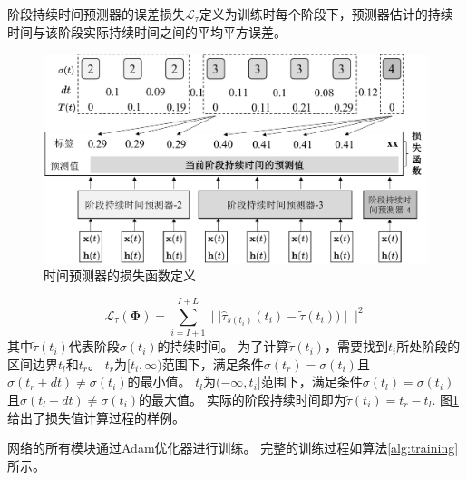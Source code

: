 阶段持续时间预测器的误差损失$\mathcal{L}_{\tau}$定义为训练时每个阶段下，预测器估计的持续时间与该阶段实际持续时间之间的平均平方误差。

\begin{figure}
    \centering
    \includegraphics[width=0.8\linewidth]{figures/chapter4/dt_label.pdf}
    \caption{时间预测器的损失函数定义}
    \label{fig:dt_label}
\end{figure}
\begin{equation}
    \mathcal{L}_{\tau}(\boldsymbol \Phi) =\sum_{i=I+1}^{I+L} \mid\mid\hat{\tau}_{s(t_i) }(t_i)-\tilde {\tau}(t_i))\mid\mid^2
\end{equation}
其中$\tilde {\tau}(t_i)$代表阶段$\sigma(t_i)$的持续时间。
为了计算$\tilde {\tau}(t_i)$，需要找到$t_i$所处阶段的区间边界$t_l$和$t_r$。
$t_r$为$[t_i, \infty)$范围下，满足条件$\sigma(t_r)=\sigma(t_i)$且$\sigma(t_r+dt)\neq \sigma(t_i)$的最小值。
$t_l$为$(-\infty, t_i]$范围下，满足条件$\sigma(t_l)=\sigma(t_i)$且$\sigma(t_l-dt)\neq \sigma(t_i)$的最大值。
实际的阶段持续时间即为$\tilde {\tau}(t_i)=t_r-t_l$.
图\ref{fig:dt_label}给出了损失值计算过程的样例。

网络的所有模块通过Adam优化器进行训练。
完整的训练过程如算法\ref{alg:training}所示。

